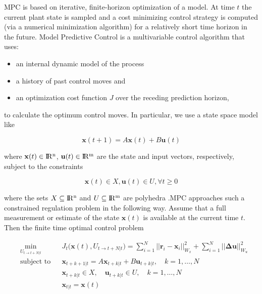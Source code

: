 \noindent MPC is based on iterative, finite-horizon optimization of a model. At time $t$ the current plant state is sampled and a cost minimizing control strategy is computed (via a numerical minimization algorithm) for a relatively short time horizon in the future. Model Predictive Control is a multivariable control algorithm that uses:

\begin{itemize}
	\item an internal dynamic model of the process
	\item a history of past control moves and
	\item an optimization cost function $J$ over the receding prediction horizon,
\end{itemize}

\noindent to calculate the optimum control moves. In particular, we use a state space model like

\begin{equation}
	\mathbf{x}(t+1) = A\mathbf{x}(t) + B\mathbf{u}(t)
\end{equation}

\noindent where $\mathbf{x}(t) \in \rm I\!R^n$, $\mathbf{u}(t) \in \rm I\!R^m$ are the state and input vectors, respectively, subject to the constraints 

\begin{equation}
	\mathbf{x}(t) \in X, \mathbf{u}(t) \in U, \forall t \ge 0
\end{equation}  

\noindent where the sets $X \subseteq \rm I\!R^n$ and $U \subseteq \rm I\!R^m$ are polyhedra \cite{MPC}.MPC approaches such a constrained regulation problem in the following way. Assume that a full measurement or estimate of the state $\mathbf{x}(t)$ is available at the current time $t$. Then the finite time optimal control problem

\begin{align}
	&\min_{U_{t\to t+N|t}} &&J_t\big(\mathbf{x}(t), U_{t\to t+N|t}\big)=\sum_{i=1}^N||\mathbf{r}_i-\mathbf{x}_i||^2_{W_x} + \sum_{i=1}^N||\boldsymbol{\Delta}\mathbf{u}||^2_{W_u} \label{eq:MPC} \\
	&\text{subject to} &&\mathbf{x}_{t+k+1|t}=A\mathbf{x}_{t+k|t}+B\mathbf{u}_{t+k|t}, \quad k=1,\dots,N \nonumber \\
	& &&\mathbf{x}_{t+k|t} \in X, \quad \mathbf{u}_{t+k|t} \in U, \quad k=1,\dots,N \nonumber \\
	& &&\mathbf{x}_{t|t}=\mathbf{x}(t) \nonumber
\end{align}

